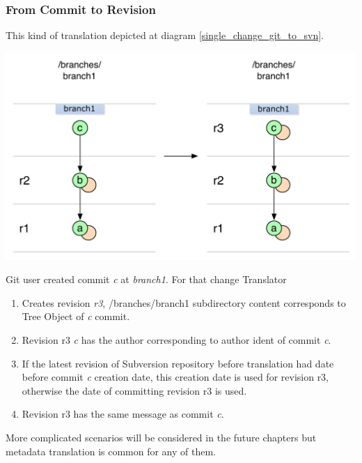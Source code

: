 \subsubsection{From Commit to Revision}
This kind of translation depicted at diagram \ref{single_change_git_to_svn}.
\begin{center}
\includegraphics[width=\textwidth]{img/diagrams/single_change_git_to_svn.pdf}%
\label{single_change_git_to_svn}%
\end{center}

Git user created commit \emph{c} at \emph{branch1}. For that change Translator
\begin{enumerate}
	\compactlist
	\item Creates revision \emph{r3}, /branches/branch1 subdirectory content corresponds to Tree Object of \emph{c} commit.
	\item Revision r3 \emph{c} has the author corresponding to author ident of commit \emph{c}.
	\item If the latest revision of Subversion repository before translation had date before commit \emph{c} creation date, this creation date is used for revision r3, otherwise the date of committing revision r3 is used.
	\item Revision r3 has the same message as commit \emph{c}.
\end{enumerate}

More complicated scenarios will be considered in the future chapters but metadata translation is common for any of them.